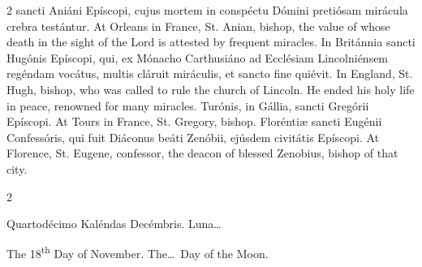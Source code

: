 \begin{paracol}{2}
 sancti Aniáni Epíscopi, cujus mortem in conspéctu Dómini pretiósam mirácula 
 crebra testántur.
\switchcolumn
{}
At Orleans in France, St. Anian, 
 bishop, the value of whose death in the sight of the Lord is attested by 
 frequent miracles.
\switchcolumn*
{}
In Británnia sancti 
 Hugónis Epíscopi, qui, ex Mónacho Carthusiáno ad Ecclésiam Lincolniénsem 
 regéndam vocátus, multis cláruit miráculis, et sancto fine quiévit.
\switchcolumn
{}
In England, St. Hugh, bishop, who 
 was called to rule the church of Lincoln. He ended his holy life in 
 peace, renowned for many miracles.
\switchcolumn*
{}
Turónis, in Gállia, 
 sancti Gregórii Epíscopi.
\switchcolumn
{}
At Tours in France, St. Gregory, 
 bishop.
\switchcolumn*
{}
Floréntiæ sancti 
 Eugénii Confessóris, qui fuit Diáconus beáti Zenóbii, ejúsdem civitátis 
 Epíscopi.
\switchcolumn
{}
At Florence, St. Eugene, confessor, 
 the deacon of blessed Zenobius, bishop of that city.
\switchcolumn*
{}
\end{paracol}


\begin{paracol}{2}
\begin{center}{\color{gregoriocolor} Quartodécimo Kaléndas Decémbris. 
 Luna\dots\ }\end{center}
\switchcolumn
{}
\begin{center}{\color{gregoriocolor} The 
 18\textsuperscript{th} Day of 
 November. The\dots\ Day of the Moon.}\end{center}
\end{paracol}

